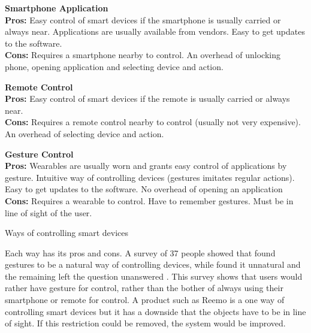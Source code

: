 \begin{table}[!htb]
    \centering
    \parbox[t][][t]{0.3\textwidth}{
        \textbf{Smartphone Application}\\
        \textbf{Pros:} Easy control of smart devices if the smartphone is usually carried or always near. 
                       Applications are usually available from vendors. 
                       Easy to get updates to the software. \\
        \textbf{Cons:} Requires a smartphone nearby to control. 
                       An overhead of unlocking phone, opening application and selecting device and action.
    }\quad
    \parbox[t][][t]{0.3\textwidth}{
        \textbf{Remote Control}\\
        \textbf{Pros:} Easy control of smart devices if the remote is usually carried or always near. \\
        \textbf{Cons:} Requires a remote control nearby to control (usually not very expensive). 
                       An overhead of selecting device and action.
    }\quad
    \parbox[t][][t]{0.3\textwidth}{
        \textbf{Gesture Control}\\
        \textbf{Pros:} Wearables are usually worn and grants easy control of applications by gesture.
                       Intuitive way of controlling devices (gestures imitates regular actions).
                       Easy to get updates to the software. 
                       No overhead of opening an application\\
        \textbf{Cons:} Requires a wearable to control. 
                       Have to remember gestures.
                       Must be in line of sight of the user.
    }
    \caption{Ways of controlling smart devices}
    \label{tbl:smartcontrol}
\end{table}

Each way has its pros and cons. 
A survey of 37 people showed that  found gestures to be a natural way of controlling devices, 
while  found it unnatural and the remaining left the question unanswered \cite{Kela2006}. 
This survey shows that users would rather have gesture for control, 
rather than the bother of always using their smartphone or remote for control.  
A product such as Reemo is a one way of controlling smart devices but it has a downside that the objects have to be in line of sight. 
If this restriction could be removed, the system would be improved.

